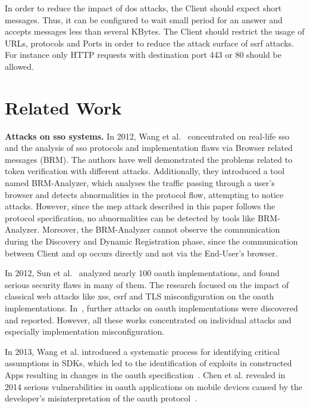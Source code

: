 \documentclass[conference,compsoc]{IEEEtran}
\renewcommand*{\paragraph}[1]{\vspace{2mm}\noindent\textbf{#1.}}
\begin{document}
In order to reduce the impact of \gls{dos} attacks, the Client should expect short messages. Thus, it can be configured to wait small period for an answer and accepts messages less than several KBytes.
The Client should restrict the usage of URLs, protocols and Ports in order to reduce the attack surface of \gls{ssrf} attacks. For instance only HTTP requests with destination port 443 or 80 should be allowed. 

\section{Related Work}
\label{sec:relatedwork}

\paragraph{Attacks on \gls{sso} systems}
In 2012, Wang et al.~\cite{microsoft} concentrated on real-life \gls{sso} and the analysis of \gls{sso} protocols and implementation flaws via Browser related messages (BRM).
The authors have well demonstrated the problems related to token verification with different attacks.
Additionally, they introduced a tool named BRM-Analyzer, which analyses the traffic passing through a user's browser and detects abnormalities in the protocol flow, attempting to notice attacks.
However, since the \gls{mep} attack described in this paper follows the protocol specification, no abnormalities can be detected by tools like BRM-Analyzer.
Moreover, the BRM-Analyzer cannot observe the communication during the Discovery and Dynamic Registration phase, since the communication between Client and \gls{op} occurs directly and not via the End-User's browser.

In 2012, Sun et al.~\cite{sun2012devil} analyzed nearly 100 \gls{oauth} implementations, and found serious security flaws in many of them.
The research focused on the impact of classical web attacks like \gls{xss}, \gls{csrf} and TLS misconfiguration on the \gls{oauth} implementations.
In~\cite{HomakovFacebookHackOAuth,HomakovOAuthQuestions,HomakovGitHubHackOAuth,GoldschlagerFacebookHackAgain,GoldschlagerFacebookHack,ssoscan}, further attacks on \gls{oauth} implementations were discovered and reported.
However, all these works concentrated on individual attacks and especially implementation misconfiguration.

In 2013, Wang et al. introduced a systematic process for identifying critical assumptions in SDKs, which led to the identification of exploits in constructed Apps resulting in changes in the \gls{oauth} specification~\cite{Wang:2013:ESU:2534766.2534801}.
Chen et al. revealed in 2014 serious vulnerabilities in \gls{oauth} applications on mobile devices caused by the developer's misinterpretation of the \gls{oauth} protocol~\cite{demystifiedOAuthCCS14}.
\end{document}
